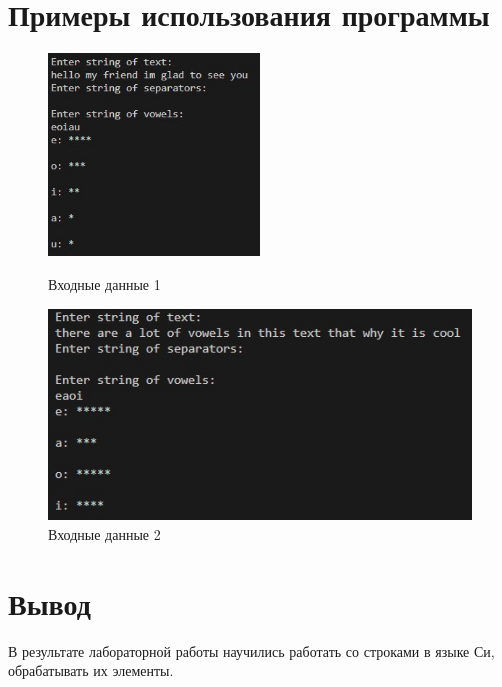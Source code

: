 \documentclass[a4paper,12pt]{report}
\begin{document}
\section*{Примеры использования программы}
    \begin{figure}[h]
        \includegraphics[width=0.5\textwidth]{ex1.jpg}
    \caption{Входные данные 1}
    \label{ris:image1}
            
        \includegraphics[width=1\textwidth]{ex2.jpg}
    \caption{Входные данные 2}
    \label{ris:image2}
    
    \end{figure}

\section*{Вывод}
В результате лабораторной работы научились работать со строками в языке Си, обрабатывать их элементы.
\end{document}
